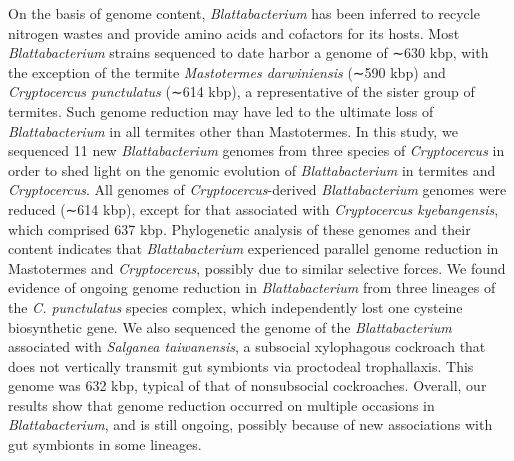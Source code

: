 \documentclass[11pt]{article}
\begin{document}
\begin{sloppypar}
On the basis of genome content, \textit{Blattabacterium} has been inferred to recycle nitrogen wastes and provide amino acids and cofactors for its hosts. 
Most \textit{Blattabacterium} strains sequenced to date harbor a genome of ∼630 kbp, with the exception of the termite \textit{Mastotermes darwiniensis} (∼590 kbp) and \textit{Cryptocercus punctulatus} (∼614 kbp), a representative of the sister group of termites. 
Such genome reduction may have led to the ultimate loss of \textit{Blattabacterium} in all termites other than Mastotermes. 
In this study, we sequenced 11 new \textit{Blattabacterium} genomes from three species of \textit{Cryptocercus} in order to shed light on the genomic evolution of \textit{Blattabacterium} in termites and \textit{Cryptocercus}. 
All genomes of \textit{Cryptocercus}-derived \textit{Blattabacterium} genomes were reduced (∼614 kbp), except for that associated with \textit{Cryptocercus kyebangensis}, which comprised 637 kbp. 
Phylogenetic analysis of these genomes and their content indicates that \textit{Blattabacterium} experienced parallel genome reduction in Mastotermes and \textit{Cryptocercus}, possibly due to similar selective forces. 
We found evidence of ongoing genome reduction in \textit{Blattabacterium} from three lineages of the \textit{C. punctulatus} species complex, which independently lost one cysteine biosynthetic gene. 
We also sequenced the genome of the \textit{Blattabacterium} associated with \textit{Salganea taiwanensis}, a subsocial xylophagous cockroach that does not vertically transmit gut symbionts via proctodeal trophallaxis. 
This genome was 632 kbp, typical of that of nonsubsocial cockroaches. 
Overall, our results show that genome reduction occurred on multiple occasions in \textit{Blattabacterium}, and is still ongoing, possibly because of new associations with gut symbionts in some lineages.

\par


\end{sloppypar}
\end{document}

